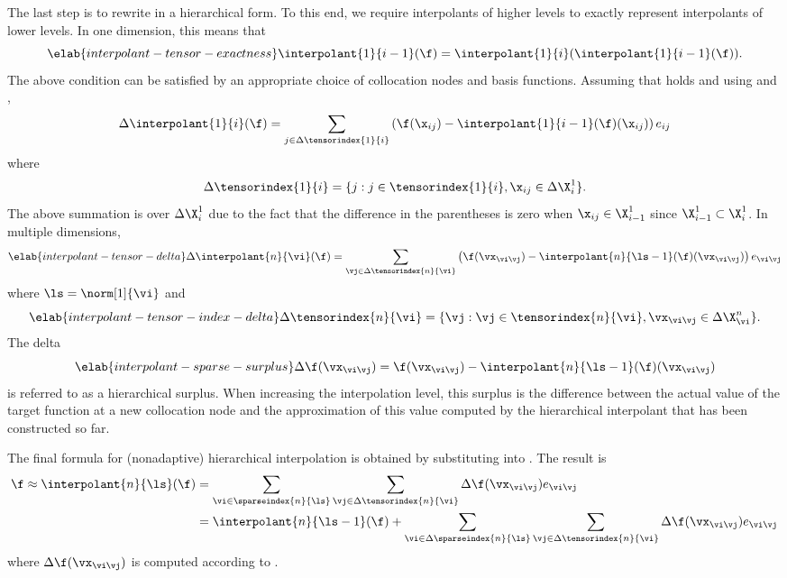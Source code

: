 The last step is to rewrite  in a
hierarchical form. To this end, we require interpolants of higher levels to
exactly represent interpolants of lower levels. In one dimension, this means
that
\begin{equation} \elab{interpolant-tensor-exactness}
  \interpolant{1}{i - 1}(\f) = \interpolant{1}{i}(\interpolant{1}{i - 1}(\f)).
\end{equation}
The above condition can be satisfied by an appropriate choice of collocation
nodes and basis functions. Assuming that 
holds and using  and ,
\[
  \Delta\interpolant{1}{i}(\f) = \sum_{j \in \Delta\tensorindex{1}{i}} \left(\f(\x_{ij}) - \interpolant{1}{i - 1}(\f)(\x_{ij})\right) e_{ij}
\]
where
\[
  \Delta\tensorindex{1}{i} = \{ j: j \in \tensorindex{1}{i}, \x_{ij} \in \Delta\X^1_i \}.
\]
The above summation is over $\Delta\X^1_i$ due to the fact that the difference
in the parentheses is zero when $\x_{ij} \in \X^1_{i - 1}$ since $\X^1_{i - 1}
\subset \X^1_i$. In multiple dimensions,
\begin{equation} \elab{interpolant-tensor-delta}
  \Delta\interpolant{n}{\vi}(\f) = \sum_{\vj \in \Delta\tensorindex{n}{\vi}} \left(\f(\vx_{\vi \vj}) - \interpolant{n}{\ls - 1}(\f)(\vx_{\vi \vj})\right) e_{\vi \vj}
\end{equation}
where $\ls = \norm[1]{\vi}$ and
\begin{equation} \elab{interpolant-tensor-index-delta}
  \Delta\tensorindex{n}{\vi} = \{ \vj: \vj \in \tensorindex{n}{\vi}, \vx_{\vi \vj} \in \Delta\X^n_{\vi} \}.
\end{equation}
The delta
\begin{equation} \elab{interpolant-sparse-surplus}
  \Delta\f(\vx_{\vi \vj}) = \f(\vx_{\vi \vj}) - \interpolant{n}{\ls - 1}(\f)(\vx_{\vi \vj})
\end{equation}
is referred to as a hierarchical surplus. When increasing the interpolation
level, this surplus is the difference between the actual value of the target
function at a new collocation node and the approximation of this value computed
by the hierarchical interpolant that has been constructed so far.

The final formula for (nonadaptive) hierarchical interpolation is obtained by
substituting  into
. The result is
\begin{align*}
  \f \approx \interpolant{n}{\ls}(\f)
  &= \sum_{\vi \in \sparseindex{n}{\ls}} \sum_{\vj \in \Delta\tensorindex{n}{\vi}} \Delta\f(\vx_{\vi \vj}) e_{\vi \vj} \\
  &= \interpolant{n}{\ls - 1}(\f) + \sum_{\vi \in \Delta\sparseindex{n}{\ls}} \sum_{\vj \in \Delta\tensorindex{n}{\vi}} \Delta\f(\vx_{\vi \vj}) e_{\vi \vj}
\end{align*}
where $\Delta\f(\vx_{\vi \vj})$ is computed according to
.
